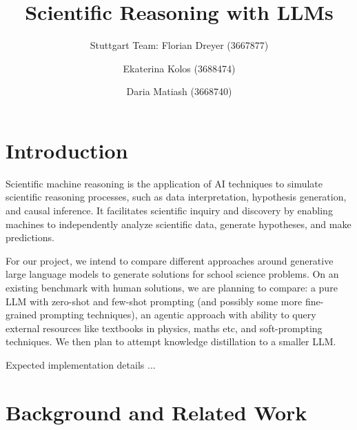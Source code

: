 \documentclass[10pt]{article}
\begin{document}
\title{Scientific Reasoning with LLMs}

\author{Stuttgart Team: Florian Dreyer (3667877) \and Ekaterina Kolos (3688474) \and Daria Matiash (3668740)}

\maketitle             


\section{Introduction}

Scientific machine reasoning is the application of AI techniques to simulate scientific reasoning processes, such as  data interpretation, hypothesis generation, and causal inference. It facilitates scientific inquiry and discovery by enabling machines to independently analyze scientific data, generate hypotheses, and make predictions.

For our project, we intend to compare different approaches around generative large language models to generate solutions for school science problems. On an existing benchmark with human solutions, we are planning to compare: a pure LLM with zero-shot and few-shot prompting (and possibly some more fine-grained prompting techniques), an agentic approach with ability to query external resources like textbooks in physics, maths etc, and soft-prompting techniques. We then plan to attempt knowledge distillation to a smaller LLM. 

Expected implementation details ...

\section{Background and Related Work}
\end{document}
